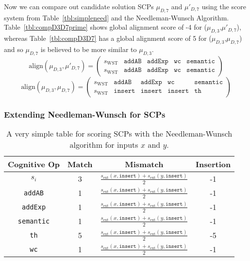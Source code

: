 Now we can compare out candidate solution SCPs $\mu_{D,7}$ and $\mu'_{D,7}$ using the score system from Table~\ref{tbl:simpleneed} and the Needleman-Wunsch Algorithm. Table~\ref{tbl:compD3D7prime} shows global alignment score of -4 for ($\mu_{D,3}$,$\mu'_{D,7}$), whereas Table~\ref{tbl:compD3D7} has a global alignment score of 5 for ($\mu_{D,3}$,$\mu_{D,7}$) and so $\mu_{D,7}$ is believed to be more similar to $\mu_{D,3}$.
\[
\text{align}(\mu_{D,3},\mu'_{D,7}) =
\begin{pmatrix}
s_\text{WST} & \texttt{addAB} & \texttt{addExp} & \texttt{wc} & \texttt{semantic} \\
s_\text{WST} & \texttt{addAB} & \texttt{addExp} & \texttt{wc} & \texttt{semantic}
\end{pmatrix}
\]
\[
\text{align}(\mu_{D,3},\mu_{D,7}) =
\begin{pmatrix}
s_\text{WST} & \texttt{addAB} & \texttt{addExp} & \texttt{wc} & \texttt{semantic} \\
s_\text{WST} & \texttt{insert} & \texttt{insert} & \texttt{insert} & \texttt{th}
\end{pmatrix}
\]


\subsubsection{Extending Needleman-Wunsch for SCPs}

\begin{table}
\begin{center}
\renewcommand{\arraystretch}{1.5}
\begin{tabular}{ c | c c c}
 \textbf{Cognitive Op}&\textbf{Match} & \textbf{Mismatch} & \textbf{Insertion} \\ 
 \hline
 $s_i$				& 3 & $\frac{s_\text{ext}(x,\texttt{insert})+s_\text{ext}(y,\texttt{insert})}{2}$  & -1 \\
 \texttt{addAB} 		& 1 & $\frac{s_\text{ext}(x,\texttt{insert})+s_\text{ext}(y,\texttt{insert})}{2}$ & -1 \\
 \texttt{addExp} 	& 1 & $\frac{s_\text{ext}(x,\texttt{insert})+s_\text{ext}(y,\texttt{insert})}{2}$ & -1 \\
 \texttt{semantic} 	& 1 & $\frac{s_\text{ext}(x,\texttt{insert})+s_\text{ext}(y,\texttt{insert})}{2}$ & -1 \\
 \texttt{th} 		& 5 & $\frac{s_\text{ext}(x,\texttt{insert})+s_\text{ext}(y,\texttt{insert})}{2}$ & -5 \\
 \texttt{wc} 		& 1 & $\frac{s_\text{ext}(x,\texttt{insert})+s_\text{ext}(y,\texttt{insert})}{2}$ & -1 \\
\end{tabular}
\caption{A very simple table for scoring SCPs with the Needleman-Wunsch algorithm for inputs $x$ and $y$.}
\label{tbl:extneed}

\end{center}
\end{table}

